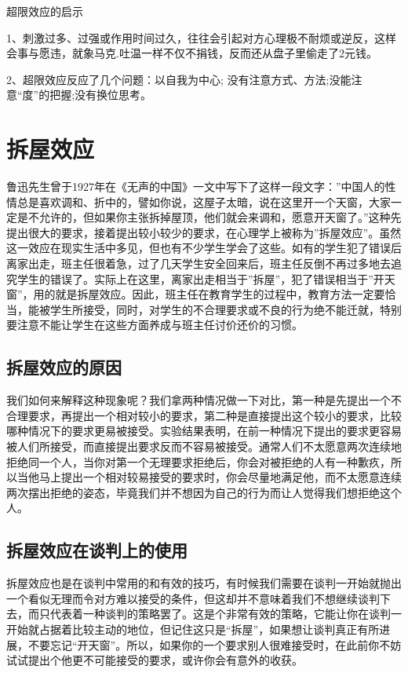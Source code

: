 \documentclass[11pt]{ctexart}
\begin{document}
超限效应的启示

1、刺激过多、过强或作用时间过久，往往会引起对方心理极不耐烦或逆反，这样会事与愿违，就象马克.吐温一样不仅不捐钱，反而还从盘子里偷走了2元钱。

2、超限效应反应了几个问题：以自我为中心; 没有注意方式、方法;没能注意“度”的把握;没有换位思考。
\section{拆屋效应}
\label{sec-19}


鲁迅先生曾于1927年在《无声的中国》一文中写下了这样一段文字：''中国人的性情总是喜欢调和、折中的，譬如你说，这屋子太暗，说在这里开一个天窗，大家一定是不允许的，但如果你主张拆掉屋顶，他们就会来调和，愿意开天窗了。”这种先提出很大的要求，接着提出较小较少的要求，在心理学上被称为''拆屋效应''。虽然这一效应在现实生活中多见，但也有不少学生学会了这些。如有的学生犯了错误后离家出走，班主任很着急，过了几天学生安全回来后，班主任反倒不再过多地去追究学生的错误了。实际上在这里，离家出走相当于''拆屋''，犯了错误相当于''开天窗''，用的就是拆屋效应。因此，班主任在教育学生的过程中，教育方法一定要恰当，能被学生所接受，同时，对学生的不合理要求或不良的行为绝不能迁就，特别要注意不能让学生在这些方面养成与班主任讨价还价的习惯。
\subsection{拆屋效应的原因}
\label{sec-19-1}


我们如何来解释这种现象呢？我们拿两种情况做一下对比，第一种是先提出一个不合理要求，再提出一个相对较小的要求，第二种是直接提出这个较小的要求，比较哪种情况下的要求更易被接受。实验结果表明，在前一种情况下提出的要求更容易被人们所接受，而直接提出要求反而不容易被接受。通常人们不太愿意两次连续地拒绝同一个人，当你对第一个无理要求拒绝后，你会对被拒绝的人有一种歉疚，所以当他马上提出一个相对较易接受的要求时，你会尽量地满足他，而不太愿意连续两次摆出拒绝的姿态，毕竟我们并不想因为自己的行为而让人觉得我们想拒绝这个人。
\subsection{拆屋效应在谈判上的使用}
\label{sec-19-2}


拆屋效应也是在谈判中常用的和有效的技巧，有时候我们需要在谈判一开始就抛出一个看似无理而令对方难以接受的条件，但这却并不意味着我们不想继续谈判下去，而只代表着一种谈判的策略罢了。这是个非常有效的策略，它能让你在谈判一开始就占据着比较主动的地位，但记住这只是“拆屋”，如果想让谈判真正有所进展，不要忘记“开天窗”。所以，如果你的一个要求别人很难接受时，在此前你不妨试试提出个他更不可能接受的要求，或许你会有意外的收获。
\end{document}
